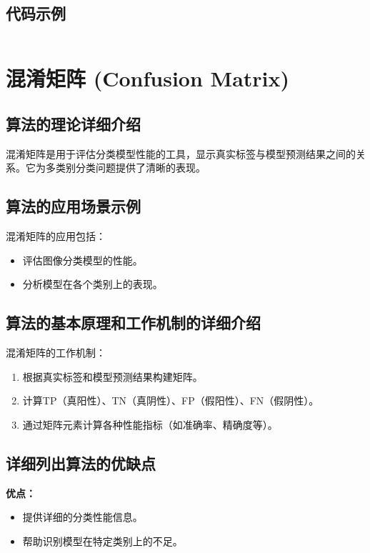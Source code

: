 \subsection*{代码示例}
\begin{lstlisting}

\end{lstlisting}


\section{混淆矩阵 (Confusion Matrix)}
\subsection*{算法的理论详细介绍}
混淆矩阵是用于评估分类模型性能的工具，显示真实标签与模型预测结果之间的关系。它为多类别分类问题提供了清晰的表现。

\subsection*{算法的应用场景示例}
混淆矩阵的应用包括：
\begin{itemize}
    \item 评估图像分类模型的性能。
    \item 分析模型在各个类别上的表现。
\end{itemize}

\subsection*{算法的基本原理和工作机制的详细介绍}
混淆矩阵的工作机制：
\begin{enumerate}
    \item 根据真实标签和模型预测结果构建矩阵。
    \item 计算TP（真阳性）、TN（真阴性）、FP（假阳性）、FN（假阴性）。
    \item 通过矩阵元素计算各种性能指标（如准确率、精确度等）。
\end{enumerate}

\subsection*{详细列出算法的优缺点}
\textbf{优点：}
\begin{itemize}
    \item 提供详细的分类性能信息。
    \item 帮助识别模型在特定类别上的不足。
\end{itemize}

